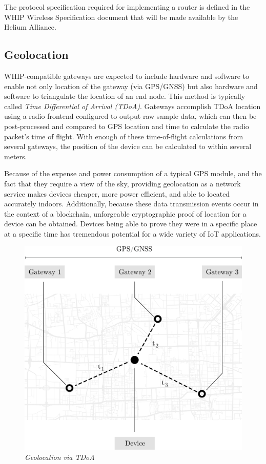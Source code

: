 \documentclass[letterpaper,11pt]{article}
\begin{document}
The protocol specification required for implementing a router is defined in the WHIP Wireless Specification document that will be made available by the Helium Alliance\cite{alliance}.

\subsection{Geolocation}\label{geolocation}

WHIP-compatible gateways are expected to include hardware and software to enable not only location of the gateway (via GPS/GNSS) but also hardware and software to triangulate the location of an end node. This method is typically called \emph{Time Differential of Arrival (TDoA)}. Gateways accomplish TDoA location using a radio frontend configured to output raw sample data, which can then be post-processed and compared to GPS location and time to calculate the radio packet's time of flight. With enough of these time-of-flight calculations from several gateways, the position of the device can be calculated to within several meters.

Because of the expense and power consumption of a typical GPS module, and the fact that they require a view of the sky, providing geolocation as a network service makes devices cheaper, more power efficient, and able to located accurately indoors. Additionally, because these data transmission events occur in the context of a blockchain, unforgeable cryptographic proof of location for a device can be obtained. Devices being able to prove they were in a specific place at a specific time has tremendous potential for a wide variety of IoT applications.

\begin{figure}[H]
    \begin{center}
          \includegraphics[scale=0.3]{tdoa.eps}
          \caption{\emph{Geolocation via TDoA}}
          \label{fig:tdoa}
     \end{center}
\end{figure}
\end{document}
